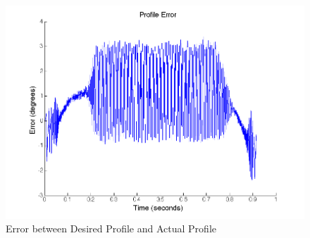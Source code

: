 \documentclass{article}
\newcommand{\xxx}[1]{\textcolor{red}{#1}}
\theoremstyle{plain}
\theoremstyle{definition}
\theoremstyle{remark}
\begin{document}
\begin{figure}[hbt]
\begin{center}
\includegraphics[width = 12cm]{4cProfileError.png}
\caption{Error between Desired Profile and Actual Profile}
\label{Q4c_PE}
\end{center}
\end{figure}

\clearpage





%
\end{document}
